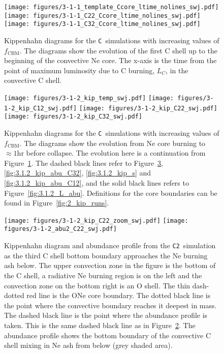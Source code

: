 \documentclass[useAMS,usenatbib]{mn2e}
\newcommand{\fcbm}{\ensuremath{f_\mathrm{CBM}}}
\newcommand{\Cb}{\textsc{\texttt{C2}}}
\newcommand{\C}{\textsc{\texttt{C}}}
\begin{document}
\begin{figure}
	\texttt{[image: figures/3-1-1\_template\_Ccore\_ltime\_nolines\_swj.pdf]}
	\texttt{[image: figures/3-1-1\_C22\_Ccore\_ltime\_nolines\_swj.pdf]}
	\texttt{[image: figures/3-1-1\_C32\_Ccore\_ltime\_nolines\_swj.pdf]}
	\caption{
	Kippenhahn diagrams for the \C\ simulations with increasing values 
	of \fcbm. The diagrams show the evolution of the first C shell up to 
	the beginning of the convective Ne core. The x-axis is the time from 
	the point of maximum luminosity due to C burning, $L_C$, in the 
	convective C shell.
	}
	\label{fig:3.1.1_kip} %
\end{figure}

\begin{figure}
	\texttt{[image: figures/3-1-2\_kip\_temp\_swj.pdf]}
	\texttt{[image: figures/3-1-2\_kip\_C12\_swj.pdf]}
	\texttt{[image: figures/3-1-2\_kip\_C22\_swj.pdf]}
	\texttt{[image: figures/3-1-2\_kip\_C32\_swj.pdf]}
	\caption{
		Kippenhahn diagrams for the \C\ simulations with increasing values 
		of \fcbm. The diagrams show the evolution from Ne core burning to
		$\approx 1\mathrm{hr}$ before collapse. The evolution here is a 
		continuation from Figure~\ref{fig:3.1.1_kip}. The dashed black lines 
		refer to Figure~\ref{fig:3.1.2_kip_abu}, \ref{fig:3.1.2_kip_abu_C32}, 
		\ref{fig:3.1.2_kip_s} and \ref{fig:3.1.2_kip_abu_C12}, and the solid 
		black lines refers to Figure~\ref{fig:3.1.2_L_abu}. Definitions for the 
		core boundaries can be found in Figure~\ref{fig:2_kip_runs}.
	}
	\label{fig:3.1.2_kip} %
\end{figure}

\begin{figure}
	\texttt{[image: figures/3-1-2\_kip\_C22\_zoom\_swj.pdf]}
	\texttt{[image: figures/3-1-2\_abu2\_C22\_swj.pdf]}
	\caption{
		Kippenhahn diagram and abundance profile from the \Cb\ 
		simulation as the third C shell bottom boundary approaches 
		the Ne burning ash below. The upper convection 
		zone in the figure is the bottom of the C shell, a radiative Ne 
		burning region is on the left and the convection zone on the bottom 
		right is an O shell. The thin dash-dotted red line is the ONe 
		core boundary. The dotted black line is the point where the 
		convective boundary reaches it deepest in mass. The dashed 
		black line is the point where the abundance profile is taken. 
		This is the same dashed black line as in 
		Figure~\ref{fig:3.1.2_kip}. The abundance profile shows 
		the bottom boundary of the convective C shell mixing in Ne 
		ash from below (grey shaded area).
	}
	\label{fig:3.1.2_kip_abu} %
\end{figure}
\end{document}
